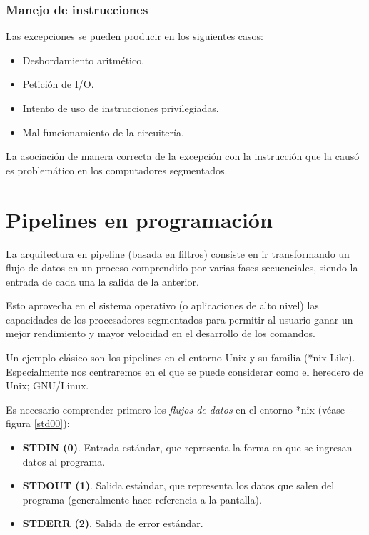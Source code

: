 \documentclass[a4paper, 11pt, titlepage]{article}
\begin{document}
        \subsubsection{Manejo de instrucciones}

            Las excepciones se pueden producir en los siguientes casos:

            \begin{itemize}
                \item Desbordamiento aritmético.
                \item Petición de I/O.
                \item Intento de uso de instrucciones privilegiadas.
                \item Mal funcionamiento de la circuitería.
            \end{itemize}

            La asociación de manera correcta de la excepción con la instrucción que la causó es problemático en los computadores segmentados.

\section{Pipelines en programación}

    La arquitectura en pipeline (basada en filtros) consiste en ir transformando un flujo de datos en un proceso comprendido por varias fases 
    secuenciales, siendo la entrada de cada una la salida de la anterior. 

    Esto aprovecha en el sistema operativo (o aplicaciones de alto nivel) las capacidades de los procesadores segmentados para permitir 
    al usuario ganar un mejor rendimiento y mayor velocidad en el desarrollo de los comandos. 

    Un ejemplo clásico son los pipelines en el entorno Unix y su familia (*nix Like). Especialmente nos centraremos en 
    el que se puede considerar como el heredero de Unix; GNU/Linux.

    Es necesario comprender primero los \textit{flujos de datos} en el entorno *nix (véase figura \ref{std00}):

    \begin{itemize}
        \item \textbf{STDIN (0)}. Entrada estándar, que representa la forma en que se ingresan datos al programa.
        \item \textbf{STDOUT (1)}. Salida estándar, que representa los datos que salen del programa (generalmente hace referencia a la pantalla).
        \item \textbf{STDERR (2)}. Salida de error estándar.
    \end{itemize}
\end{document}
